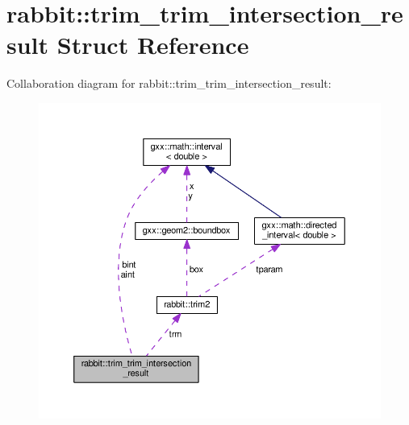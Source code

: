 \hypertarget{structrabbit_1_1trim__trim__intersection__result}{}\section{rabbit\+:\+:trim\+\_\+trim\+\_\+intersection\+\_\+result Struct Reference}
\label{structrabbit_1_1trim__trim__intersection__result}


Collaboration diagram for rabbit\+:\+:trim\+\_\+trim\+\_\+intersection\+\_\+result\+:
\nopagebreak
\begin{figure}[H]
\begin{center}
\leavevmode
\includegraphics[width=350pt]{structrabbit_1_1trim__trim__intersection__result__coll__graph}
\end{center}
\end{figure}
